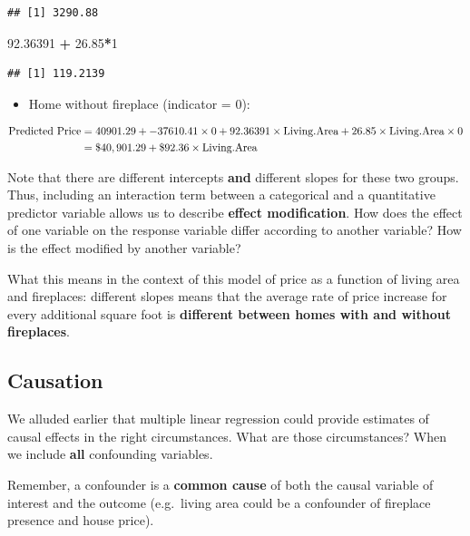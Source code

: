 \documentclass[]{book}
\newenvironment{Shaded}{\begin{snugshade}}{\end{snugshade}}
\newcommand{\DecValTok}[1]{\textcolor[rgb]{0.00,0.00,0.81}{#1}}
\newcommand{\FloatTok}[1]{\textcolor[rgb]{0.00,0.00,0.81}{#1}}
\newcommand{\OperatorTok}[1]{\textcolor[rgb]{0.81,0.36,0.00}{\textbf{#1}}}
\newcommand{\StringTok}[1]{\textcolor[rgb]{0.31,0.60,0.02}{#1}}
\providecommand{\tightlist}{%
  \setlength{\itemsep}{0pt}\setlength{\parskip}{0pt}}
\begin{document}
\begin{verbatim}
## [1] 3290.88
\end{verbatim}

\begin{Shaded}
\begin{Highlighting}[]
\FloatTok{92.36391} \OperatorTok{+}\StringTok{ }\FloatTok{26.85}\OperatorTok{*}\DecValTok{1}
\end{Highlighting}
\end{Shaded}

\begin{verbatim}
## [1] 119.2139
\end{verbatim}

\begin{itemize}
\tightlist
\item
  Home without fireplace (indicator = 0):
\end{itemize}

\[
\begin{align*}
\hbox{Predicted Price} &= 40901.29 + -37610.41 \times 0 + 92.36391 \times \hbox{Living.Area} + 26.85 \times \hbox{Living.Area} \times 0 \\
&= \$40,901.29 + \$92.36 \times \hbox{Living.Area}
\end{align*}
\]

Note that there are different intercepts \textbf{and} different slopes for these two groups. Thus, including an interaction term between a categorical and a quantitative predictor variable allows us to describe \textbf{effect modification}. How does the effect of one variable on the response variable differ according to another variable? How is the effect modified by another variable?

What this means in the context of this model of price as a function of living area and fireplaces: different slopes means that the average rate of price increase for every additional square foot is \textbf{different between homes with and without fireplaces}.

\hypertarget{causation}{%
\subsection{Causation}\label{causation}}

We alluded earlier that multiple linear regression could provide estimates of causal effects in the right circumstances. What are those circumstances? When we include \textbf{all} confounding variables.

Remember, a confounder is a \textbf{common cause} of both the causal variable of interest and the outcome (e.g.~living area could be a confounder of fireplace presence and house price).
\end{document}

